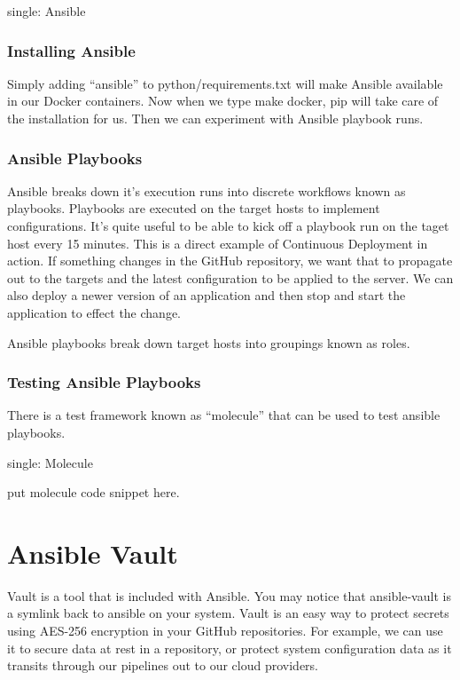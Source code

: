 single: Ansible

\subsubsection{Installing Ansible}
\justifying
Simply adding ``ansible'' to python/requirements.txt will make Ansible available in our Docker containers.
Now when we type make docker, pip will take care of the installation for us. Then we can experiment
with Ansible playbook runs.

\subsubsection{Ansible Playbooks}
\justifying
Ansible breaks down it's execution runs into discrete workflows known as playbooks. Playbooks are
executed on the target hosts to implement configurations. It's quite useful to be able to kick off a
playbook run on the taget host every 15 minutes. This is a direct example of Continuous Deployment in
action. If something changes in the GitHub repository, we want that to propagate out to the targets and
the latest configuration to be applied to the server. We can also deploy a newer
version of an application and then stop and start the application to effect the change.

\justifying
Ansible playbooks break down target hosts into groupings known as roles.

\subsubsection{Testing Ansible Playbooks}

\justifying
There is a test framework known as ``molecule'' that can be used to test
ansible playbooks.

single: Molecule

put molecule code snippet here.

\section{Ansible Vault}
\justifying
Vault is a tool that is included with Ansible. You may notice that
ansible-vault is a symlink back to ansible on your system. Vault is an
easy way to protect secrets using AES-256 encryption in your GitHub
repositories. For example, we can use it to secure data at rest in a
repository, or protect system configuration data as it transits through
our pipelines out to our cloud providers.

